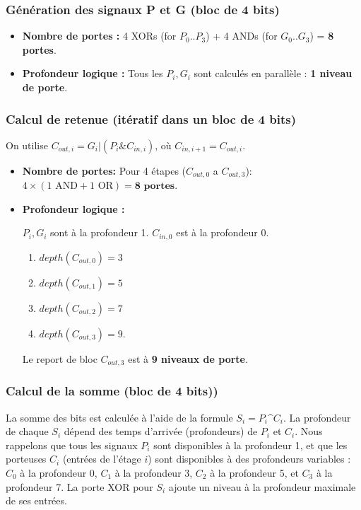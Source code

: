\subsubsection{Génération des signaux P et G (bloc de 4 bits)}
\begin{itemize}
    \item \textbf{Nombre de portes :} 4 XORs (for $P_0..P_3$) + 4 ANDs (for $G_0..G_3$) = \textbf{8 portes}.
    \item \textbf{Profondeur logique :} Tous les $P_i, G_i$ sont calculés en parallèle : \textbf{1 niveau de porte}.
\end{itemize}

\subsubsection{Calcul de retenue (itératif dans un bloc de 4 bits)}
On utilise $C_{out,i} = G_i | (P_i \& C_{in,i})$, où $C_{in,i+1} = C_{out,i}$.
\begin{itemize}
    \item \textbf{Nombre de portes:} Pour 4 étapes ($C_{out,0}$ a $C_{out,3}$): $4 \times (1 \text{ AND} + 1 \text{ OR}) = \textbf{8 portes}$.
    \item \textbf{Profondeur logique :}
        
        $P_i, G_i$ sont à la profondeur 1. $C_{in,0}$ est à la profondeur 0.
        \begin{enumerate}
           
        \item $depth(C_{out,0})=3$ 
        \item $depth(C_{out,1})=5$
        \item $depth(C_{out,2})=7$
        \item $depth(C_{out,3})=9$.
        \end{enumerate}
        
   Le report de bloc $C_{out,3}$ est à \textbf{9 niveaux de porte}.
\end{itemize}

\subsubsection{Calcul de la somme (bloc de 4 bits))}
La somme des bits est calculée à l'aide de la formule $S_i = P_i \text{\textasciicircum} C_i$. La profondeur de chaque $S_i$ dépend des temps d'arrivée (profondeurs) de $P_i$ et $C_i$. Nous rappelons que tous les signaux $P_i$ sont disponibles à la profondeur 1, et que les porteuses $C_i$ (entrées de l'étage $i$) sont disponibles à des profondeurs variables : $C_0$ à la profondeur 0, $C_1$ à la profondeur 3, $C_2$ à la profondeur 5, et $C_3$ à la profondeur 7. La porte XOR pour $S_i$ ajoute un niveau à la profondeur maximale de ses entrées.

